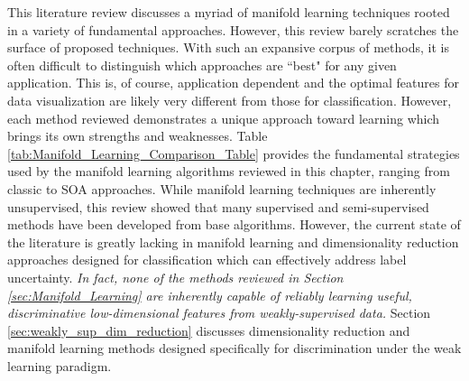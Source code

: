 This literature review discusses a myriad of manifold learning techniques rooted in a variety of fundamental approaches.  However, this review barely scratches the surface of proposed techniques.  With such an expansive corpus of methods, it is often difficult to distinguish which approaches are ``best" for any given application.  This is, of course, application dependent and the optimal features for data visualization are likely very different from those for classification.  However, each method reviewed demonstrates a unique approach toward learning which brings its own strengths and weaknesses.  Table \ref{tab:Manifold_Learning_Comparison_Table} provides the fundamental strategies used by the manifold learning algorithms reviewed in this chapter, ranging from classic to SOA approaches.  While manifold learning techniques are inherently unsupervised, this review showed that many supervised and semi-supervised methods have been developed from base algorithms. However, the current state of the literature is greatly lacking in manifold learning and dimensionality reduction approaches designed for classification which can effectively address label uncertainty.  \textit{In fact, none of the methods reviewed in Section \ref{sec:Manifold_Learning} are inherently capable of reliably learning useful, discriminative low-dimensional features from weakly-supervised data.}  Section \ref{sec:weakly_sup_dim_reduction} discusses dimensionality reduction and manifold learning methods designed specifically for discrimination under the weak learning paradigm.


